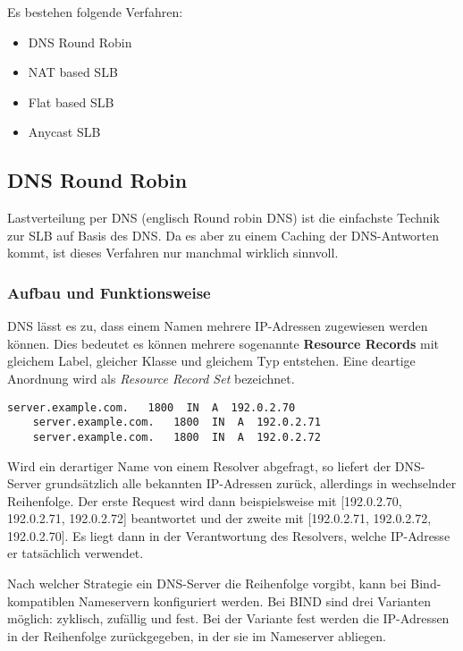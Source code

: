 Es bestehen folgende Verfahren:
\begin{itemize}
	\item DNS Round Robin
	\item NAT based SLB
	\item Flat based SLB
	\item Anycast SLB
\end{itemize}

\newpage
\subsection{DNS Round Robin}
Lastverteilung per DNS (englisch Round robin DNS) ist die einfachste Technik zur SLB auf Basis des DNS. Da es aber zu einem Caching der DNS-Antworten kommt, ist dieses Verfahren nur manchmal wirklich sinnvoll.

\subsubsection{Aufbau und Funktionsweise}
DNS lässt es zu, dass einem Namen mehrere IP-Adressen zugewiesen werden können. Dies bedeutet es können mehrere sogenannte \textbf{Resource Records} mit gleichem Label, gleicher Klasse und gleichem Typ entstehen. Eine deartige Anordnung wird als \textit{Resource Record Set} bezeichnet.
\begin{center}

\begin{lstlisting}[caption=DNS Round Robin Example]
    server.example.com.   1800  IN  A  192.0.2.70
    server.example.com.   1800  IN  A  192.0.2.71
    server.example.com.   1800  IN  A  192.0.2.72
\end{lstlisting}
\end{center}
Wird ein derartiger Name von einem Resolver abgefragt, so liefert der DNS-Server grundsätzlich alle bekannten IP-Adressen zurück, allerdings in wechselnder Reihenfolge. Der erste Request wird dann beispielsweise mit [192.0.2.70, 192.0.2.71, 192.0.2.72] beantwortet und der zweite mit [192.0.2.71, 192.0.2.72, 192.0.2.70]. Es liegt dann in der Verantwortung des Resolvers, welche IP-Adresse er tatsächlich verwendet.

Nach welcher Strategie ein DNS-Server die Reihenfolge vorgibt, kann bei Bind-kompatiblen Nameservern konfiguriert werden. Bei BIND sind drei Varianten möglich: zyklisch, zufällig und fest. Bei der Variante fest werden die IP-Adressen in der Reihenfolge zurückgegeben, in der sie im Nameserver abliegen.

